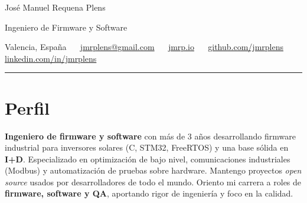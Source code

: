 \documentclass[11pt,a4paper]{article}
\let\jmrpsection\section
\renewcommand{\section}[1]{\needspace{4\baselineskip}\jmrpsection{#1}}
\newcommand{\divider}{\textcolor{muted}{\ \raisebox{0.4ex}{\scriptsize$\bullet$}\ }}
\begin{document}
{\headingfont\fontsize{22pt}{24pt}\selectfont José Manuel Requena Plens}\par
\vspace{2pt}
{\large\color{accent}Ingeniero de Firmware y Software}\par
\vspace{4pt}
{\small\color{muted}%
Valencia, España \divider
\href{mailto:jmrplens@gmail.com}{jmrplens@gmail.com} \divider
\href{https://jmrp.io}{jmrp.io} \divider
\href{https://github.com/jmrplens}{github.com/jmrplens} \divider
\href{https://www.linkedin.com/in/jmrplens}{linkedin.com/in/jmrplens}%
}\par
\vspace{2pt}
{\color{accent}\rule{\linewidth}{1.2pt}}

\section{Perfil}
\textbf{Ingeniero de firmware y software} con más de 3 años desarrollando firmware industrial para inversores solares (C, STM32, FreeRTOS) y una base sólida en \textbf{I+D}. Especializado en optimización de bajo nivel, comunicaciones industriales (Modbus) y automatización de pruebas sobre hardware. Mantengo proyectos \textit{open source} usados por desarrolladores de todo el mundo. Oriento mi carrera a roles de \textbf{firmware, software y QA}, aportando rigor de ingeniería y foco en la calidad.

\end{document}
